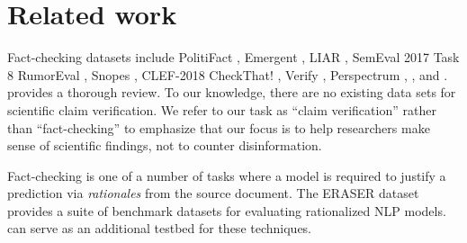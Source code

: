 \section{Related work}

\label{sec:related_work}

Fact-checking datasets include PolitiFact \cite{Vlachos2014FactCT}, Emergent \cite{ferreira-vlachos-2016-emergent}, LIAR \cite{Wang2017LiarLP}, SemEval 2017 Task 8 RumorEval \cite{derczynski-etal-2017-semeval}, Snopes \cite{Popat2017WhereTT}, CLEF-2018 CheckThat! \cite{nakov2018overview}, Verify \cite{baly-etal-2018-integrating}, Perspectrum \cite{Chen2019SeeingTF}, \fever \cite{Thorne2018FEVERAL}, and \snopes \cite{Hanselowski2019ARA}. \citet{Hanselowski2019ARA} provides a thorough review.  To our knowledge, there are no existing data sets for scientific claim verification. We refer to our task as ``claim verification'' rather than ``fact-checking'' to emphasize that our focus is to help researchers make sense of scientific findings, not to counter disinformation.

Fact-checking is one of a number of tasks where a model is required to justify a prediction via \emph{rationales} from the source document. The ERASER dataset \cite{DeYoung2019ERASERAB} provides a suite of benchmark datasets for evaluating rationalized NLP models. \ours can serve as an additional testbed for these techniques.




